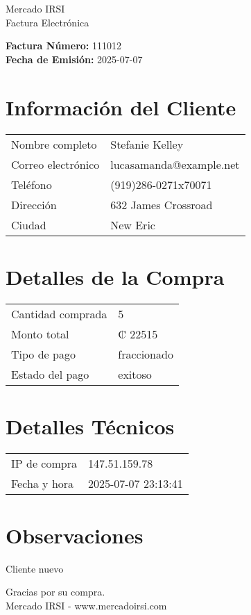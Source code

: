 \documentclass[12pt]{article}
\begin{document}
\begin{center}
    \Huge Mercado IRSI \\
    \Large Factura Electrónica
\end{center}

\vspace{0.5cm}

\noindent \textbf{Factura Número:} 111012 \\
\textbf{Fecha de Emisión:} 2025-07-07

\vspace{0.5cm}

\section*{Información del Cliente}
\begin{longtable}{ll}
Nombre completo & Stefanie Kelley \\
Correo electrónico & lucasamanda@example.net \\
Teléfono & (919)286-0271x70071 \\
Dirección & 632 James Crossroad \\
Ciudad & New Eric \\
\end{longtable}

\vspace{0.5cm}

\section*{Detalles de la Compra}
\begin{longtable}{ll}
Cantidad comprada & 5 \\
Monto total & ₡ 22515 \\
Tipo de pago & fraccionado \\
Estado del pago & exitoso \\
\end{longtable}

\vspace{0.5cm}

\section*{Detalles Técnicos}
\begin{longtable}{ll}
IP de compra & 147.51.159.78 \\
Fecha y hora & 2025-07-07 23:13:41 \\
\end{longtable}

\vspace{0.5cm}

\section*{Observaciones}
Cliente nuevo

\vspace{0.5cm}

\begin{center}
    Gracias por su compra. \\
    Mercado IRSI - www.mercadoirsi.com
\end{center}
\end{document}
